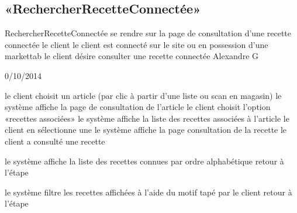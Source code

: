 \subsection{«RechercherRecetteConnectée»}

\startCU
\nom RechercherRecetteConnectée
\but se rendre sur la page de consultation d'une recette connectée
\acteur le client
\precondition le client est connecté sur le site ou en possession d'une markettab
\declenchement le client désire consulter une recette connectée
\auteur Alexandre G
\date 30/10/2014

\nominal %
\startnominal
\etape[DEBUT] le client choisit un article (par clic à partir d'une liste ou scan en magasin)
\etape le système affiche la page de consultation de l'article
\etape le client choisit l'option «recettes associées»
\etape le système affiche la liste des recettes associées à l'article 
\etape[SELECT] le client en sélectionne une
\etape le système affiche la page consultation de la recette
\stopnominal
\postcondition le client a consulté une recette

\alternatifs 
\startalternatif[DEBUT] 
  \etape le système affiche la liste des recettes connues par ordre alphabétique
  \etape retour à l'étape \in[SELECT]
\stopcondition
\stopalternatif

\startalternatif[SELECT] 
  \etape le système filtre les recettes affichées à l'aide du motif tapé par le client
  \etape retour à l'étape \in[SELECT]
\stopcondition
\stopalternatif
\stopCU
